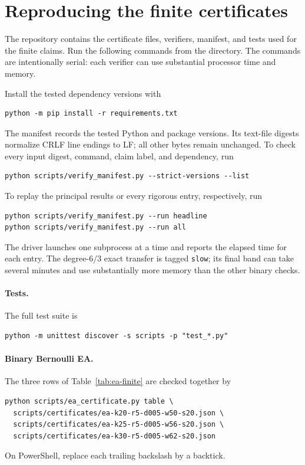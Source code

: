 \section{Reproducing the finite certificates}
\label{app:artifact}

The repository contains the certificate files, verifiers, manifest, and tests
used for the finite claims.  Run the following commands from the
 directory.  The commands are intentionally serial: each
verifier can use substantial processor time and memory.

Install the tested dependency versions with
\begin{verbatim}
python -m pip install -r requirements.txt
\end{verbatim}
The manifest records the tested Python and package versions.  Its text-file
digests normalize CRLF line endings to LF; all other bytes remain unchanged.
To check every
input digest, command, claim label, and dependency, run
\begin{verbatim}
python scripts/verify_manifest.py --strict-versions --list
\end{verbatim}
To replay the principal results or every rigorous entry, respectively, run
\begin{verbatim}
python scripts/verify_manifest.py --run headline
python scripts/verify_manifest.py --run all
\end{verbatim}
The driver launches one subprocess at a time and reports the elapsed time for
each entry.  The degree-$6/3$ exact transfer is tagged \texttt{slow}; its final
band can take several minutes and use substantially more memory than the
other binary checks.

\paragraph{Tests.}
The full test suite is
\begin{verbatim}
python -m unittest discover -s scripts -p "test_*.py"
\end{verbatim}

\paragraph{Binary Bernoulli EA.}
The three rows of Table~\ref{tab:ea-finite} are checked together by
\begin{verbatim}
python scripts/ea_certificate.py table \
  scripts/certificates/ea-k20-r5-d005-w50-s20.json \
  scripts/certificates/ea-k25-r5-d005-w56-s20.json \
  scripts/certificates/ea-k30-r5-d005-w62-s20.json
\end{verbatim}
On PowerShell, replace each trailing backslash by a backtick.

